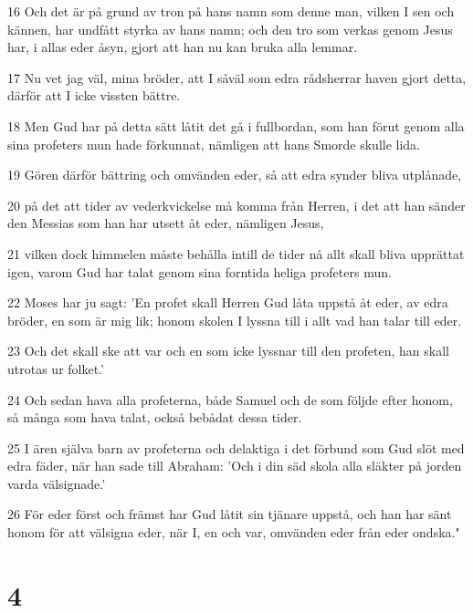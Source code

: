 \par 16 Och det är på grund av tron på hans namn som denne man, vilken I sen och kännen, har undfått styrka av hans namn; och den tro som verkas genom Jesus har, i allas eder åsyn, gjort att han nu kan bruka alla lemmar.
\par 17 Nu vet jag väl, mina bröder, att I såväl som edra rådsherrar haven gjort detta, därför att I icke vissten bättre.
\par 18 Men Gud har på detta sätt låtit det gå i fullbordan, som han förut genom alla sina profeters mun hade förkunnat, nämligen att hans Smorde skulle lida.
\par 19 Gören därför bättring och omvänden eder, så att edra synder bliva utplånade,
\par 20 på det att tider av vederkvickelse må komma från Herren, i det att han sänder den Messias som han har utsett åt eder, nämligen Jesus,
\par 21 vilken dock himmelen måste behålla intill de tider nå allt skall bliva upprättat igen, varom Gud har talat genom sina forntida heliga profeters mun.
\par 22 Moses har ju sagt: 'En profet skall Herren Gud låta uppstå åt eder, av edra bröder, en som är mig lik; honom skolen I lyssna till i allt vad han talar till eder.
\par 23 Och det skall ske att var och en som icke lyssnar till den profeten, han skall utrotas ur folket.'
\par 24 Och sedan hava alla profeterna, både Samuel och de som följde efter honom, så många som hava talat, också bebådat dessa tider.
\par 25 I ären själva barn av profeterna och delaktiga i det förbund som Gud slöt med edra fäder, när han sade till Abraham: 'Och i din säd skola alla släkter på jorden varda välsignade.'
\par 26 För eder först och främst har Gud låtit sin tjänare uppstå, och han har sänt honom för att välsigna eder, när I, en och var, omvänden eder från eder ondska."

\chapter{4}


